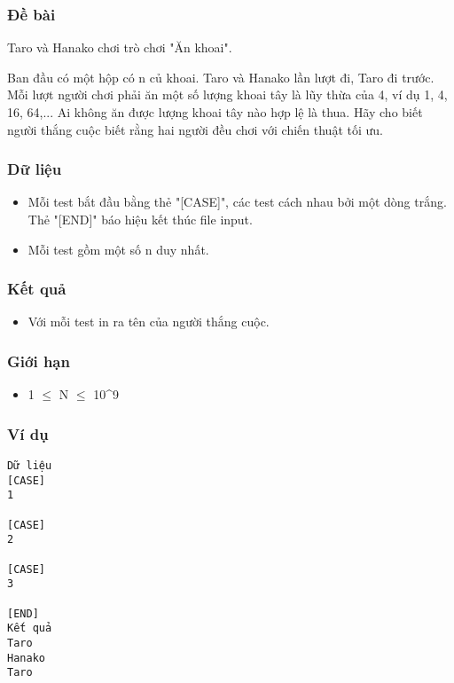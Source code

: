 



\subsubsection{   Đề bài  }

   Taro và Hanako chơi trò chơi "Ăn khoai".  

   Ban đầu có một hộp có n củ khoai. Taro và Hanako lần lượt đi, Taro đi trước. Mỗi lượt người chơi phải ăn một số lượng khoai tây là lũy thừa của 4, ví dụ 1, 4, 16, 64,... Ai không ăn được lượng khoai tây nào hợp lệ là thua. Hãy cho biết người thắng cuộc biết rằng hai người đều chơi với chiến thuật tối ưu.  

\subsubsection{   Dữ liệu  }
\begin{itemize}
	\item     Mỗi test bắt đầu bằng thẻ "[CASE]", các test cách nhau bởi một dòng trắng. Thẻ "[END]" báo hiệu kết thúc file input.   
	\item     Mỗi test gồm một số n duy nhất.   
\end{itemize}

\subsubsection{   Kết quả  }
\begin{itemize}
	\item     Với mỗi test in ra tên của người thắng cuộc.   
\end{itemize}

\subsubsection{   Giới hạn  }
\begin{itemize}
	\item     1  $\le$  N  $\le$  10^9   
\end{itemize}

\subsubsection{   Ví dụ  }
\begin{verbatim}
Dữ liệu
[CASE]
1

[CASE]
2

[CASE]
3

[END]
Kết quả
Taro
Hanako
Taro
\end{verbatim}
